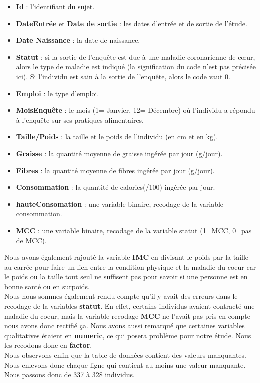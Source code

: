 \documentclass[
]{article}
\begin{document}
\begin{itemize}
\item \textbf{Id} : l'identifiant du sujet. \
\item   \textbf{DateEntrée} et \textbf{Date de sortie} : les dates d’entrée et de sortie de l’étude. \
\item   \textbf{Date Naissance} : la date de naissance. \
\item   \textbf{Statut} : si la sortie de l’enquête est due à une maladie coronarienne de cœur, alors le type de maladie est indiqué (la signification du code n’est pas précisée ici). Si l’individu est sain à la sortie  de l’enquête, alors le code vaut 0.\
\item   \textbf{Emploi} : le type d’emploi.\
\item   \textbf{MoisEnquête} : le mois (1= Janvier, 12= Décembre) où l’individu a répondu à l’enquête sur ses pratiques alimentaires.\
\item   \textbf{Taille/Poids} : la taille et le poids de l'individu (en cm et en kg).\
\item   \textbf{Graisse} : la quantité moyenne de graisse ingérée par jour (g/jour).\
\item   \textbf{Fibres} : la quantité moyenne de fibres ingérée par jour (g/jour).\
\item   \textbf{Consommation} : la quantité de calories(/100) ingérée par jour.\
\item   \textbf{hauteConsomation} : une variable binaire, recodage de la variable consommation.\
\item   \textbf{MCC} : une variable binaire, recodage de la variable statut (1=MCC, 0=pas de MCC). \
\end{itemize}

Nous avons également rajouté la variable \(\textbf{IMC}\) en divisant le
poids par la taille au carrée pour faire un lien entre la condition
physique et la maladie du coeur car le poids ou la taille tout seul ne
suffisent pas pour savoir si une personne est en bonne santé ou en
surpoids.\\

Nous nous sommes également rendu compte qu'il y avait des erreurs dans
le recodage de la variables \textbf{statut}. En effet, certains
individus avaient contracté une maladie du coeur, mais la variable
recodage \textbf{MCC} ne l'avait pas pris en compte nous avons donc
rectifié ça. Nous avons aussi remarqué que certaines variables
qualitatives étaient en \textbf{numeric}, ce qui posera problème pour
notre étude. Nous les recodons donc en \textbf{factor}.\\
Nous observons enfin que la table de données contient des valeurs
manquantes. Nous enlevons donc chaque ligne qui contient au moins une
valeur manquante. Nous passons donc de 337 à 328 individus.\\
\end{document}
